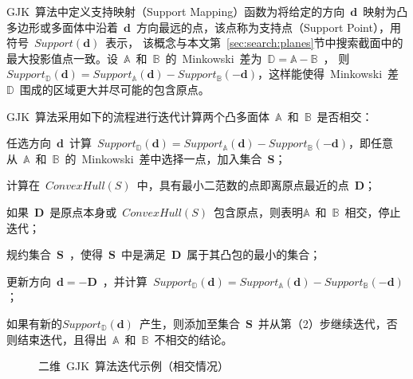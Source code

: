 GJK~算法中定义支持映射（Support Mapping）函数为将给定的方向~$\bm{d}$~映射为凸多边形或多面体中沿着~$\bm{d}$~方向最远的点，该点称为支持点（Support Point），用符号~$Support(\bm{d})$~表示，
该概念与本文第~\ref{sec:search:planes}节中搜索截面中的最大投影值点一致。设~$\mathbb{A}$~和~$\mathbb{B}$~的~Minkowski~差为~$\mathbb{D} = \mathbb{A}-\mathbb{B}$~，
则~$Support_\mathbb{D}(\bm{d}) = Support_\mathbb{A}(\bm{d}) - Support_\mathbb{B}(-\bm{d})$，这样能使得~Minkowski~差~$\mathbb{D}$~围成的区域更大并尽可能的包含原点。

GJK~算法采用如下的流程\cite{ericson2005real}进行迭代计算两个凸多面体~$\mathbb{A}$~和~$\mathbb{B}$~是否相交：

\begin{inparaenum}[(1)]
  \item 任选方向~$\bm{d}$~计算~$Support_\mathbb{D}(\bm{d}) = Support_\mathbb{A}(\bm{d}) - Support_\mathbb{B}(-\bm{d})$，即任意从~$\mathbb{A}$~和~$\mathbb{B}$~的~Minkowski~差中选择一点，加入集合~$\bm{S}$；\\ \indent
  \item 计算在~$ConvexHull(S)$~中，具有最小二范数的点即离原点最近的点~$\bm{D}$； \\ \indent
  \item 如果~$\bm{D}$~是原点本身或~$ConvexHull(S)$~包含原点，则表明$\mathbb{A}$~和~$\mathbb{B}$~相交，停止迭代；\\ \indent
  \item 规约集合~$\bm{S}$~，使得~$\bm{S}$~中是满足~$\bm{D}$~属于其凸包的最小的集合；\\ \indent
  \item 更新方向~$\bm{d} = -\bm{D}$~，并计算~$Support_\mathbb{D}(\bm{d}) = Support_\mathbb{A}(\bm{d}) - Support_\mathbb{B}(-\bm{d})$；\\ \indent
  \item 如果有新的$Support_\mathbb{D}(\bm{d})$~产生，则添加至集合~$\bm{S}$~并从第（2）步继续迭代，否则结束迭代，且得出~$\mathbb{A}$~和~$\mathbb{B}$~不相交的结论。
\end{inparaenum}

\begin{figure}[!ht]
\centering
{} 
\caption{二维~GJK~算法迭代示例（相交情况）}
\label{fig:gjk:example:2d:intersection:iterator}
\end{figure}


